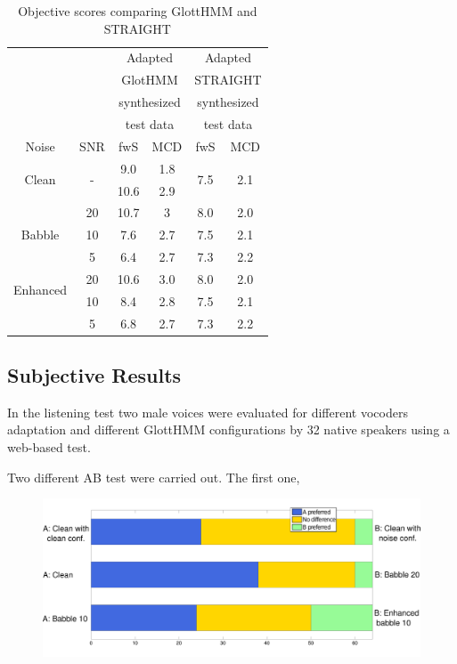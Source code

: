 \begin{table}[htb]
\begin{centering}
\begin{tabular}{c c|c c|c c}
	 & & \multicolumn{2}{c|}{Adapted} & \multicolumn{2}{c}{Adapted}\\
	 & & \multicolumn{2}{c|}{GlotHMM} & \multicolumn{2}{c}{STRAIGHT}\\
	 & & \multicolumn{2}{c|}{synthesized} & \multicolumn{2}{c}{synthesized}\\
	 & & \multicolumn{2}{c|}{test data} & \multicolumn{2}{c}{test data}\\
	Noise & SNR & fwS & MCD & fwS & MCD\\
	\midrule
	\midrule
	\multirow{2}{*}{Clean} & \multirow{2}{*}{-} & 9.0 & 1.8 & \multirow{2}{*}{7.5} & \multirow{2}{*}{2.1}\\
	 & & 10.6 & 2.9 & & \\	
	\midrule
	\multirow{3}{*}{Babble} & 20 & 10.7 & 3 & 8.0 & 2.0\\
	 & 10 & 7.6 & 2.7 & 7.5 & 2.1\\
	 & 5 & 6.4 & 2.7 & 7.3 & 2.2\\
	\midrule
	\midrule
	\multirow{2}{*}{Enhanced} & 20 & 10.6 & 3.0 & 8.0 & 2.0\\
	\multirow{2}{*}{Babble} & 10 & 8.4 & 2.8 & 7.5 & 2.1\\
	 & 5 & 6.8 & 2.7 & 7.3 & 2.2\\
	\bottomrule
\end{tabular}
\caption{Objective scores comparing GlottHMM and STRAIGHT}
\label{table:comp_adapt_results}
\end{centering}
\end{table}

\subsection{Subjective Results}
\label{results_subjective}
In the listening test two male voices were evaluated for different vocoders adaptation and different GlottHMM configurations by 32 native speakers using a web-based test.

Two different AB test were carried out. 
%
The first one, 

\begin{figure}[!htb]
  \begin{centering}
  \includegraphics[width=\textwidth]{images/glott_vs_glott.pdf}
  \caption{}
  \label{fig:glott_vs_glott}
  \end{centering}
\end{figure}


